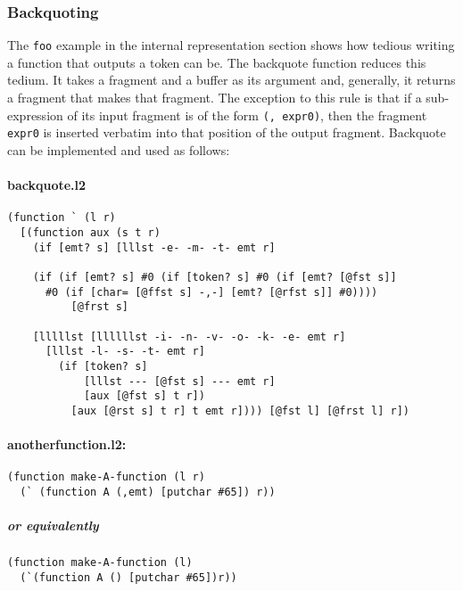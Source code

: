 \documentclass[]{article}
\let\oldparagraph\paragraph
\renewcommand{\paragraph}[1]{\oldparagraph{#1}\mbox{}}
\let\oldsubparagraph\subparagraph
\renewcommand{\subparagraph}[1]{\oldsubparagraph{#1}\mbox{}}
\begin{document}
\hypertarget{backquoting}{\subsubsection{Backquoting}\label{backquoting}}

The \texttt{foo} example in the internal representation section shows
how tedious writing a function that outputs a token can be. The
backquote function reduces this tedium. It takes a fragment and a buffer
as its argument and, generally, it returns a fragment that makes that
fragment. The exception to this rule is that if a sub-expression of its
input fragment is of the form \texttt{(,\ expr0)}, then the fragment
\texttt{expr0} is inserted verbatim into that position of the output
fragment. Backquote can be implemented and used as follows:

\paragraph{backquote.l2}\label{backquote.l2}

\begin{verbatim}
(function ` (l r)
  [(function aux (s t r)
    (if [emt? s] [lllst -e- -m- -t- emt r]

    (if (if [emt? s] #0 (if [token? s] #0 (if [emt? [@fst s]]
      #0 (if [char= [@ffst s] -,-] [emt? [@rfst s]] #0))))
          [@frst s]

    [lllllst [llllllst -i- -n- -v- -o- -k- -e- emt r]
      [lllst -l- -s- -t- emt r]
        (if [token? s]
            [lllst --- [@fst s] --- emt r]
            [aux [@fst s] t r])
          [aux [@rst s] t r] t emt r]))) [@fst l] [@frst l] r])
\end{verbatim}

\paragraph{anotherfunction.l2:}\label{anotherfunction.l2}

\begin{verbatim}
(function make-A-function (l r)
  (` (function A (,emt) [putchar #65]) r))
\end{verbatim}

\subparagraph{or equivalently}\label{or-equivalently-2}

\begin{verbatim}
(function make-A-function (l)
  (`(function A () [putchar #65])r))
\end{verbatim}
\end{document}
